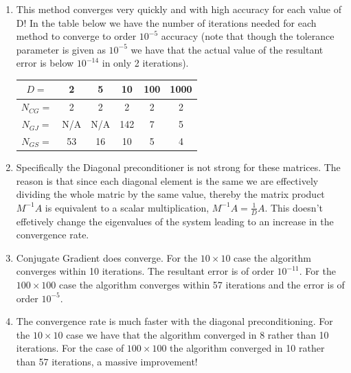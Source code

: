 \documentclass{article}
\begin{document}
\begin{enumerate}
\begin{proof}
\[        \]
        

        \end{proof}

        \item This method converges very quickly and with high accuracy for each value of D! In the table below we have the number of iterations needed for each method to converge to order $10^{-5}$ accuracy (note that though the tolerance parameter is given as $10^{-5}$ we have that the actual value of the resultant error is below $10^{-14}$ in only 2 iterations). 

            \begin{center}

                \begin{tabular}{|c|c|c|c|c|c|}
                \hline
                $D = $ & 2 & 5 & 10 & 100 & 1000 \\
                \hline
                $N_{CG} = $ & 2 & 2 & 2 & 2 & 2 \\
                \hline
                $N_{GJ} = $ & N/A & N/A & 142 & 7 & 5 \\
                \hline
                $N_{GS} = $ & 53 & 16 & 10 & 5 & 4 \\
                \hline
                \end{tabular}

            \end{center}

        \item Specifically the Diagonal preconditioner is not strong for these matrices. The reason is that since each diagonal element is the same we are effectively dividing the whole matric by the same value, thereby the matrix product $M^{-1}A$ is equivalent to a scalar multiplication, $M^{-1}A = \frac{1}{D}A$. This doesn't effetively change the eigenvalues of the system leading to an increase in the convergence rate. 

        \item
            Conjugate Gradient does converge. For the $10 \times 10$ case the algorithm converges within 10 iterations. The resultant error is of order $10^{-11}$. For the $100 \times 100$ case the algorithm converges within 57 iterations and the error is of order $10^{-5}$. 

        \item
        The convergence rate is much faster with the diagonal preconditioning. For the $10 \times 10$ case we have that the algorithm converged in 8 rather than 10 iterations. For the case of $100\times 100$ the algorithm converged in 10 rather than 57 iterations, a massive improvement!

    \end{enumerate}
\end{document}
